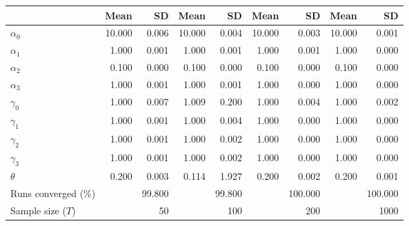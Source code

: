
\begin{tabular}[t]{lrrrrrrrr}
\toprule
  & Mean & SD & Mean  & SD  & Mean   & SD   & Mean    & SD   \\
\midrule
$\alpha_{0}$ & 10.000 & 0.006 & 10.000 & 0.004 & 10.000 & 0.003 & 10.000 & 0.001\\
$\alpha_{1}$ & 1.000 & 0.001 & 1.000 & 0.001 & 1.000 & 0.001 & 1.000 & 0.000\\
$\alpha_{2}$ & 0.100 & 0.000 & 0.100 & 0.000 & 0.100 & 0.000 & 0.100 & 0.000\\
$\alpha_{3}$ & 1.000 & 0.001 & 1.000 & 0.001 & 1.000 & 0.000 & 1.000 & 0.000\\
$\gamma_{0}$ & 1.000 & 0.007 & 1.009 & 0.200 & 1.000 & 0.004 & 1.000 & 0.002\\
$\gamma_{1}$ & 1.000 & 0.001 & 1.000 & 0.004 & 1.000 & 0.000 & 1.000 & 0.000\\
$\gamma_{2}$ & 1.000 & 0.001 & 1.000 & 0.002 & 1.000 & 0.000 & 1.000 & 0.000\\
$\gamma_{3}$ & 1.000 & 0.001 & 1.000 & 0.002 & 1.000 & 0.000 & 1.000 & 0.000\\
$\theta$ & 0.200 & 0.003 & 0.114 & 1.927 & 0.200 & 0.002 & 0.200 & 0.001\\
Runs converged (\%) &  & 99.800 &  & 99.800 &  & 100.000 &  & 100.000\\
Sample size ($T$) &  & 50 &  & 100 &  & 200 &  & 1000\\
\bottomrule
\end{tabular}
